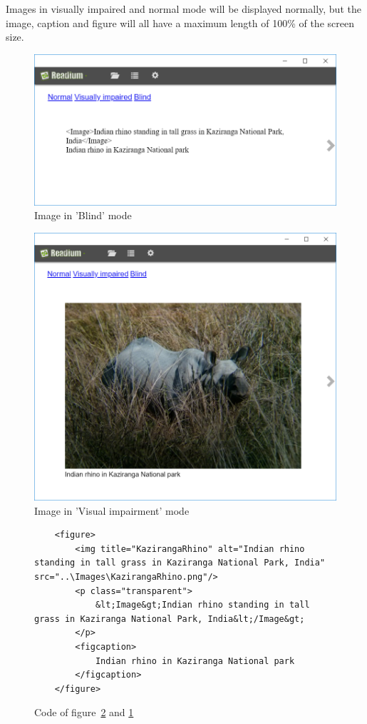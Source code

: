 Images in visually impaired and normal mode will be displayed normally, but the image, caption and figure will all have a maximum length of 100\% of the screen size.

\begin{figure}[H]
	\centering
	\includegraphics[width=\linewidth]{figures/ImageBl.PNG}
	\caption{Image in 'Blind' mode}
	\label{fig:image_blind}
\end{figure}

\begin{figure}[H]
	\centering
	\includegraphics[width=\linewidth]{figures/ImageVi.PNG}
	\caption{Image in 'Visual impairment' mode}
	\label{fig:image_viimp}
\end{figure}



\begin{figure}[H]
	\lstset{language=HTML}
	\begin{lstlisting}
	<figure>
		<img title="KazirangaRhino" alt="Indian rhino standing in tall grass in Kaziranga National Park, India" src="..\Images\KazirangaRhino.png"/>
		<p class="transparent">
			&lt;Image&gt;Indian rhino standing in tall grass in Kaziranga National Park, India&lt;/Image&gt;
		</p>
		<figcaption> 
			Indian rhino in Kaziranga National park
		</figcaption>
	</figure>
	\end{lstlisting}
	\caption{Code of figure~\ref{fig:image_viimp} and \ref{fig:image_blind}}
	\label{fig:image_code}
\end{figure}

